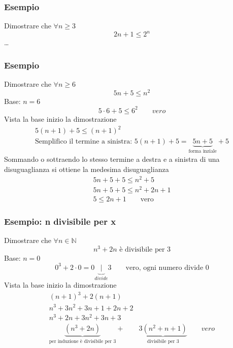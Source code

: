 \documentclass[italian]{article}
\begin{document}
\subsubsection{Esempio}
Dimostrare che $\forall n \geq 3$
\[
	2n+1 \leq2^n
\]
\dots
\subsubsection{Esempio}
Dimostrare che $\forall n \geq 6$
\[
	5n + 5 \leq n^2
\]
Base: $n=6$
\[
	5\cdot 6 + 5 \leq 6^2 \qquad vero
\]
Vista la base inizio la dimostrazione
\begin{gather*}
	5(n+1)+5\leq(n+1)^2 \\
	\text{Semplifico il termine a sinistra: }
	5(n+1) + 5 = \underbrace{5n + 5}_{\text{forma inziale}} + 5
\end{gather*}
Sommando o sottraendo lo stesso termine a destra e a sinistra di una disuguaglianza si ottiene la medesima disuguaglianza
\begin{gather*}
	5n + 5 + 5 \leq n^2 + 5 \\
	5n + 5 + 5 \leq n^2 + 2n + 1 \\
	5 \leq 2n + 1 \qquad \text{vero}
\end{gather*}

\subsubsection{Esempio: n divisibile per x}
Dimostrare che $\forall n \in \mathbb{N}$
\[
	n^3 + 2n \text{ è divisibile per } 3
\]
Base: $n=0$
\[
	0^3 + 2\cdot 0 = 0 \underbrace{\;|\;}_{divide} 3 \qquad \text{vero, ogni numero divide 0}
\]
Vista la base inizio la dimostrazione
\begin{gather*}
	(n+1)^3 + 2(n+1) \\
	n^3 + 3n^2 + 3n + 1 + 2n + 2 \\
	n^3 + 2n + 3n^2 + 3n + 3 \\
	\underbrace{(n^3+2n)}_{\text{per induzione è divisibile per 3}} + \qquad \underbrace{3(n^2 + n + 1)}_{\text{divisibile per 3}} \qquad vero
\end{gather*}
\pagebreak
\end{document}
